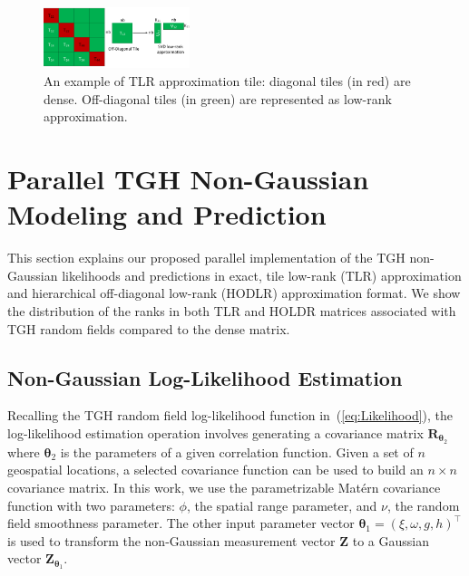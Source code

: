 \documentclass[conference]{IEEEtran}
\begin{document}
\begin{figure}[h]
\centering
\includegraphics[width=0.38\textwidth]{./figures/tlr_graph.pdf}
\caption{An example of TLR approximation tile: diagonal tiles (in red) are dense. Off-diagonal tiles (in green) are represented as
low-rank approximation.}
\label{fig:tlr-structure}
\end{figure}

\section{Parallel TGH Non-Gaussian Modeling and Prediction}

This section explains our proposed parallel
implementation of the TGH non-Gaussian likelihoods
and predictions in exact, tile low-rank (TLR) approximation
and hierarchical off-diagonal low-rank (HODLR) approximation
format. We show the
distribution of the ranks in both TLR and HOLDR matrices
associated with TGH random fields compared to the dense matrix.



\subsection{Non-Gaussian Log-Likelihood Estimation}
Recalling the TGH random field log-likelihood function
in~(\ref{eq:Likelihood}), the log-likelihood estimation
operation involves generating a covariance 
matrix $\bm{R}_{\bm{\theta}_2}$ where $\bm{\theta}_2$ is the parameters of 
a given correlation function. Given a set of $n$ geospatial
locations, a selected covariance function can be used to
build an $n \times n$ covariance matrix. In this work, we
use the parametrizable Mat\'ern covariance function with
two parameters: $\phi$, the spatial range parameter, 
and $\nu$, the random field smoothness parameter.  
The other input parameter vector $\bm{\theta}_1= (\xi, \omega, g, h)^\top$ 
is used to transform the non-Gaussian measurement 
vector $\bm{Z}$  to a Gaussian vector $\bm{Z}_{\bm{\theta}_1}$. 
\end{document}
